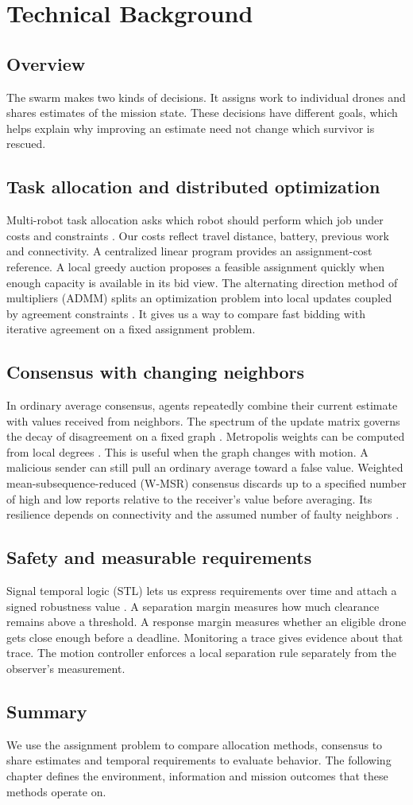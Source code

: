 \chapter{Technical Background}
\section{Overview}
The swarm makes two kinds of decisions. It assigns work to individual drones and shares estimates of the mission state. These decisions have different goals, which helps explain why improving an estimate need not change which survivor is rescued.

\section{Task allocation and distributed optimization}
Multi-robot task allocation asks which robot should perform which job under costs and constraints \cite{gerkey}. Our costs reflect travel distance, battery, previous work and connectivity. A centralized linear program provides an assignment-cost reference. A local greedy auction proposes a feasible assignment quickly when enough capacity is available in its bid view. The alternating direction method of multipliers (ADMM) splits an optimization problem into local updates coupled by agreement constraints \cite{boyd}. It gives us a way to compare fast bidding with iterative agreement on a fixed assignment problem.

\section{Consensus with changing neighbors}
In ordinary average consensus, agents repeatedly combine their current estimate with values received from neighbors. The spectrum of the update matrix governs the decay of disagreement on a fixed graph \cite{xiao}. Metropolis weights can be computed from local degrees \cite{metropolis}. This is useful when the graph changes with motion. A malicious sender can still pull an ordinary average toward a false value. Weighted mean-subsequence-reduced (W-MSR) consensus discards up to a specified number of high and low reports relative to the receiver's value before averaging. Its resilience depends on connectivity and the assumed number of faulty neighbors \cite{leblanc}.

\section{Safety and measurable requirements}
Signal temporal logic (STL) lets us express requirements over time and attach a signed robustness value \cite{fainekos}. A separation margin measures how much clearance remains above a threshold. A response margin measures whether an eligible drone gets close enough before a deadline. Monitoring a trace gives evidence about that trace. The motion controller enforces a local separation rule separately from the observer's measurement.

\section{Summary}
We use the assignment problem to compare allocation methods, consensus to share estimates and temporal requirements to evaluate behavior. The following chapter defines the environment, information and mission outcomes that these methods operate on.
